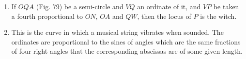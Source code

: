 \begin{enumerate}
%
%
%
%
%
%
%
%
%
%
\item If $OQA$ (Fig. 79) be a semi-circle and $VQ$ an ordinate of it, and $VP$ 
    be taken a fourth proportional to $ON$, $OA$ and $QW$, then the locus of $P$
    is the witch.

%
%
%
%
%
%
%
%
%
%
%
%
%
%
%
%
%
%
%
%
%
\item This is the curve in which a musical string vibrates when sounded. The
    ordinates are proportional to the sines of angles which are the same
    fractions of four right angles that the corresponding abscissas are of some
    given length.


\end{enumerate}
